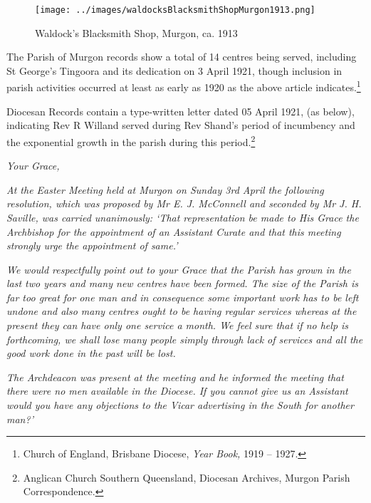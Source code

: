 \begin{figure}
\begin{center}
\texttt{[image: ../images/waldocksBlacksmithShopMurgon1913.png]}
\caption{Waldock's Blacksmith Shop, Murgon, ca. 1913}
\end{center}
\end{figure}




The Parish of Murgon records show a total of 14 centres being served, including St George's Tingoora and its dedication on 3 April 1921, though inclusion in parish activities occurred at least as early as 1920 as the above article indicates.\footnote{Church of England, Brisbane Diocese, \emph{Year Book,} 1919 -- 1927.}


Diocesan Records contain a type-written letter dated 05 April 1921, (as below), indicating Rev R Willand served during Rev Shand's period of incumbency and the exponential growth in the parish during this period.\footnote{Anglican Church Southern Queensland, Diocesan Archives, Murgon Parish Correspondence.}


\medskip


\emph{Your Grace,}



\emph{At the Easter Meeting held at Murgon on Sunday 3rd April the following resolution, which was proposed by Mr E. J. McConnell and seconded by Mr J. H. Saville, was carried unanimously: `That representation be made to His Grace the Archbishop for the appointment of an Assistant Curate and that this meeting strongly urge the appointment of same.'}



\emph{We would respectfully point out to your Grace that the Parish has grown in the last two years and many new centres have been formed. The size of the Parish is far too great for one man and in consequence some important work has to be left undone and also many centres ought to be having regular services whereas at the present they can have only one service a month. We feel sure that if no help is forthcoming, we shall lose many people simply through lack of services and all the good work done in the past will be lost.}



\emph{The Archdeacon was present at the meeting and he informed the meeting that there were no men available in the Diocese. If you cannot give us an Assistant would you have any objections to the Vicar advertising in the South for another man?'}



